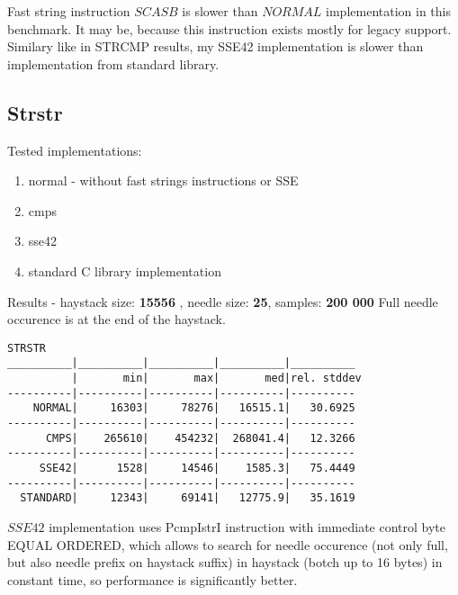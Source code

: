 \documentclass[11pt,a4paper]{article}
\begin{document}
Fast string instruction $SCASB$ is slower than $NORMAL$ implementation in this benchmark.
It may be, because this instruction exists mostly for legacy support.
Similary like in STRCMP results, my SSE42 implementation is slower than implementation from standard library.


\subsection{Strstr}\label{subsec:strstr}
    Tested implementations:
    \begin{enumerate}
        \item normal - without fast strings instructions or SSE
        \item cmps
        \item sse42
        \item standard C library implementation
    \end{enumerate}
Results - haystack size: \textbf{15556} , needle size: \textbf{25}, samples: \textbf{200 000} \newline
Full needle occurence is at the end of the haystack.
\begin{lstlisting}[]
STRSTR
__________|__________|__________|__________|__________
          |       min|       max|       med|rel. stddev
----------|----------|----------|----------|----------
    NORMAL|     16303|     78276|   16515.1|   30.6925
----------|----------|----------|----------|----------
      CMPS|    265610|    454232|  268041.4|   12.3266
----------|----------|----------|----------|----------
     SSE42|      1528|     14546|    1585.3|   75.4449
----------|----------|----------|----------|----------
  STANDARD|     12343|     69141|   12775.9|   35.1619
\end{lstlisting}
$SSE42$ implementation uses PcmpIstrI instruction with immediate control byte EQUAL ORDERED, which allows to search for needle occurence (not only full, but also needle prefix on haystack suffix) in haystack (botch up to 16 bytes) in constant time, so performance is significantly better.
\end{document}
